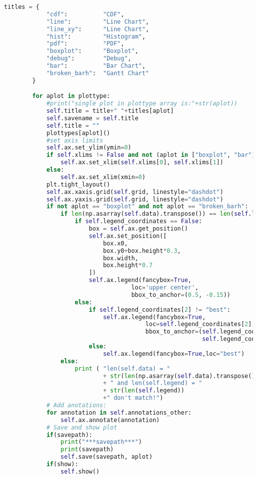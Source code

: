 \begin{lstlisting}[language=Python,caption=myplot.py]
        titles = {
            "cdf":          "CDF",
            "line":         "Line Chart",
            "line_xy":      "Line Chart",
            "hist":         "Histogram",
            "pdf":          "PDF",
            "boxplot":      "Boxplot",
            "debug":        "Debug",
            "bar":          "Bar Chart",
            "broken_barh":  "Gantt Chart"
        }

        for aplot in plottype:
            #print("single plot in plottype array is:"+str(aplot))
            self.title = title+" "+titles[aplot]
            self.savename = self.title
            self.title = ""
            plottypes[aplot]()
            #set axis limits
            self.ax.set_ylim(ymin=0)
            if self.xlims != False and not (aplot in ["boxplot", "bar"]):
                self.ax.set_xlim(self.xlims[0], self.xlims[1])
            else:
                self.ax.set_xlim(xmin=0)
            plt.tight_layout()
            self.ax.xaxis.grid(self.grid, linestyle="dashdot")
            self.ax.yaxis.grid(self.grid, linestyle="dashdot")
            if not aplot == "boxplot" and not aplot == "broken_barh":
                if len(np.asarray(self.data).transpose()) == len(self.legend):
                    if self.legend_coordinates == False:
                        box = self.ax.get_position()
                        self.ax.set_position([
                            box.x0,
                            box.y0+box.height*0.3,
                            box.width,
                            box.height*0.7
                        ])
                        self.ax.legend(fancybox=True,
                                    loc='upper center',
                                    bbox_to_anchor=(0.5, -0.15))
                    else:
                        if self.legend_coordinates[2] != "best":
                            self.ax.legend(fancybox=True,
                                        loc=self.legend_coordinates[2],
                                        bbox_to_anchor=(self.legend_coordinates[0],
                                                        self.legend_coordinates[1]))
                        else:
                            self.ax.legend(fancybox=True,loc="best")
                else:
                    print ( "len(self.data) = "
                            + str(len(np.asarray(self.data).transpose()))
                            + " and len(self.legend) = "
                            + str(len(self.legend))
                            +" don't match!")
            # Add anotations:
            for annotation in self.annotations_other:
                self.ax.annotate(annotation)
            # Save and show plot
            if(savepath):
                print("***savepath***")
                print(savepath)
                self.save(savepath, aplot)
            if(show):
                self.show()


\end{lstlisting}
